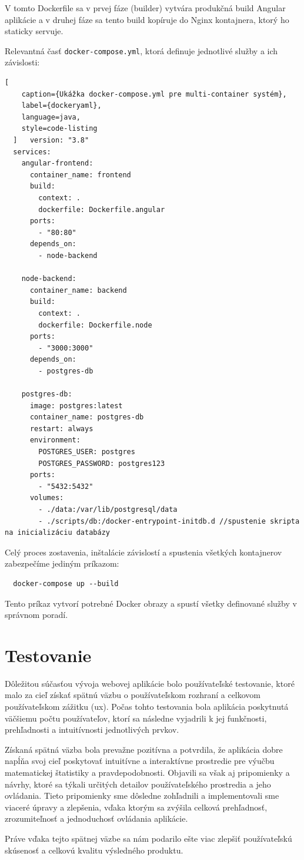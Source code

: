   V tomto Dockerfile sa v prvej fáze (builder) vytvára produkčná build Angular aplikácie a v druhej fáze sa tento build kopíruje do Nginx kontajnera, ktorý ho staticky servuje.
  
  Relevantná časť \texttt{docker-compose.yml}, ktorá definuje jednotlivé služby a ich závislosti:
  
  \begin{lstlisting}[
    caption={Ukážka docker-compose.yml pre multi-container systém},
    label={dockeryaml},
    language=java,
    style=code-listing
  ]   version: "3.8"
  services:
    angular-frontend:
      container_name: frontend
      build:
        context: .
        dockerfile: Dockerfile.angular
      ports:
        - "80:80"
      depends_on:
        - node-backend
  
    node-backend:
      container_name: backend
      build:
        context: .
        dockerfile: Dockerfile.node
      ports:
        - "3000:3000"
      depends_on:
        - postgres-db
  
    postgres-db:
      image: postgres:latest
      container_name: postgres-db
      restart: always
      environment:
        POSTGRES_USER: postgres
        POSTGRES_PASSWORD: postgres123
      ports:
        - "5432:5432"
      volumes:
        - ./data:/var/lib/postgresql/data
        - ./scripts/db:/docker-entrypoint-initdb.d //spustenie skripta na inicializáciu databázy
  \end{lstlisting}
  
  Celý proces zostavenia, inštalácie závislostí a spustenia všetkých kontajnerov zabezpečíme jediným príkazom:
  
  \begin{verbatim}
  docker-compose up --build
  \end{verbatim}
  
  Tento príkaz vytvorí potrebné Docker obrazy a spustí všetky definované služby v správnom poradí.
  


  \section{Testovanie}
  Dôležitou súčasťou vývoja webovej aplikácie bolo používateľské testovanie, ktoré malo za cieľ získať spätnú väzbu o používateľskom rozhraní a celkovom používateľskom zážitku (\acrshort{ux}). 
  Počas tohto testovania bola aplikácia poskytnutá väčšiemu počtu používateľov, ktorí sa následne vyjadrili k jej funkčnosti, prehľadnosti a intuitívnosti jednotlivých prvkov.

Získaná spätná väzba bola prevažne pozitívna a potvrdila, že aplikácia dobre napĺňa svoj cieľ poskytovať intuitívne a interaktívne prostredie pre výučbu matematickej štatistiky a pravdepodobnosti. 
Objavili sa však aj pripomienky a návrhy, ktoré sa týkali určitých detailov používateľského prostredia a jeho ovládania. 
Tieto pripomienky sme dôsledne zohľadnili a implementovali sme viaceré úpravy a zlepšenia, vďaka ktorým sa zvýšila celková prehľadnosť, zrozumiteľnosť a jednoduchosť ovládania aplikácie.

Práve vďaka tejto spätnej väzbe sa nám podarilo ešte viac zlepšiť používateľskú skúsenosť a celkovú kvalitu výsledného produktu.